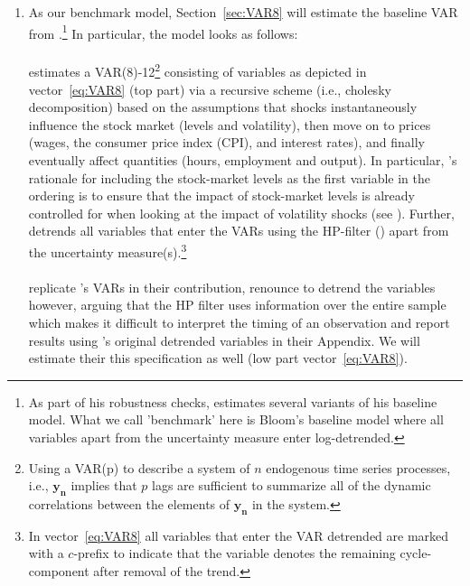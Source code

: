 \documentclass[a4paper,11pt,listof=nochaptergap,oneside,pointednumbers,bibtotoc,bigheadings,liststotoc]{scrbook}
\theoremstyle{mysatz}
\theoremstyle{mydefinition}
\theoremstyle{mybemerkung}
\newcommand{\vect}[1]{\boldsymbol{\mathbf{#1}}}
\begin{document}
\begin{itemize}
\begin{enumerate}
\item As our benchmark model, Section~\ref{sec:VAR8} will estimate the baseline VAR from \citet{bloom:09}.\footnote{As part of his robustness checks, \citet{bloom:09} estimates several variants of his baseline model. What we call 'benchmark' here is Bloom's baseline model where all variables apart from the uncertainty measure enter log-detrended.} In particular, the model looks as follows:\\
\\
\citet{bloom:09} estimates a VAR(8)-12\footnote{Using a VAR(p) to describe a system of $n$ endogenous time series processes, i.e., $\vect{y_n}$ implies that $p$ lags are sufficient to summarize all of the dynamic correlations between the elements of $\vect{y_n}$ in the system.} consisting of variables as depicted in vector~\ref{eq:VAR8} (top part) via a recursive scheme (i.e., cholesky decomposition) based on the assumptions that shocks instantaneously influence the stock market (levels and volatility), then move on to prices (wages, the consumer price index (CPI), and interest rates), and finally eventually affect quantities (hours, employment and output). In particular, \citet{bloom:09}'s rationale for including the stock-market levels as the first variable in the ordering is to ensure that the impact of stock-market levels is already controlled for when looking at the impact of volatility shocks (see \citealp[p. 630]{bloom:09}). Further, \citet{bloom:09} detrends all variables that enter the VARs using the HP-filter (\citealp{hodrickandprescott:97}) apart from the uncertainty measure(s).\footnote{In vector~\ref{eq:VAR8} all variables that enter the VAR detrended are marked with a $c$-prefix to indicate that the variable denotes the remaining cycle-component after removal of the trend.}\\
\\
\citet{juradoetal:15} replicate \citet{bloom:09}'s VARs in their contribution, renounce to detrend the variables however, arguing that the HP filter uses information over the entire sample which makes it difficult to interpret the timing of an observation and report results using \citet{bloom:09}'s original detrended variables in their Appendix. We will estimate their this specification as well (low part vector~\ref{eq:VAR8}).


\end{enumerate}
\end{itemize}
\end{document}

